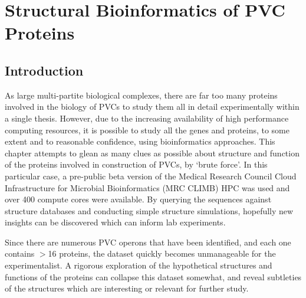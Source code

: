 \pagestyle{IHA-fancy-style}


\chapter{Structural Bioinformatics of PVC Proteins}\label{structbioinfo}
\section{Introduction}


As large multi-partite biological complexes, there are far too many proteins involved in the biology of PVCs to study them all in detail experimentally within a single thesis. However, due to the increasing availability of high performance computing resources, it is possible to study all the genes and proteins, to some extent and to reasonable confidence, using bioinformatics approaches. This chapter attempts to glean as many clues as possible about structure and function of the proteins involved in construction of PVCs, by `brute force'. In this particular case, a pre-public beta version of the Medical Research Council Cloud Infrastructure for Microbial Bioinformatics (MRC CLIMB) HPC was used and over 400 compute cores were available. By querying the sequences against structure databases and conducting simple structure simulations, hopefully new insights can be discovered which can inform  lab experiments.

Since there are numerous PVC operons that have been identified, and each one contains $>$16 proteins, the dataset quickly becomes unmanageable for the experimentalist. A rigorous exploration of the hypothetical structures and functions of the proteins can collapse this dataset somewhat, and reveal subtleties of the structures which are interesting or relevant for further study. 

